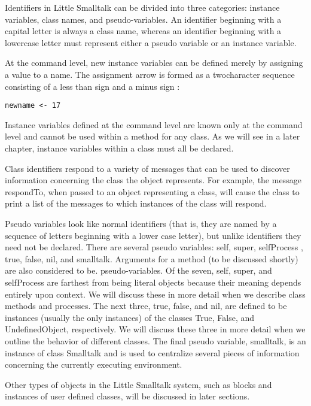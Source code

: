 
Identifiers in Little Smalltalk can be divided into three categories: instance
variables, class names, and pseudo-variables. An identifier beginning with
a capital letter is always a class name, whereas an identifier beginning
with a lowercase letter must represent either a pseudo variable or an
instance variable.

At the command level, new instance variables can be defined merely
by assigning a value to a name. The assignment arrow is formed as a twocharacter sequence consisting of a less than sign and a minus sign
:
\begin{lstlisting}
newname <- 17
\end{lstlisting}

Instance variables defined at the command level are known only at the
command level and cannot be used within a method for any class. As we
will see in a later chapter, instance variables within a class must all be
declared.

Class identifiers respond to a variety of messages that can be used to
discover information concerning the class the object represents. For example, the message respondTo, when passed to an object representing a
class, will cause the class to print a list of the messages to which instances
of the class will respond.

Pseudo variables look like normal identifiers (that is, they are named
by a sequence of letters beginning with a lower case letter), but unlike
identifiers they need not be declared. There are several pseudo variables:
self, super, selfProcess
, true, false, nil, and smalltalk. Arguments for
a method (to be discussed shortly) are also considered to be. pseudo-variables. Of the seven, self, super, and selfProcess are farthest from being
literal objects because their meaning depends entirely upon context. We
will discuss these in more detail when we describe class methods and
processes. The next three, true, false, and nil, are defined to be instances
(usually the only instances) of the classes True, False, and UndefinedObject, respectively. We will discuss these three in more detail when
we outline the behavior of different classes. The final pseudo variable,
smalltalk, is an instance of class Smalltalk and is used to centralize several
pieces of information concerning the currently executing environment.

Other types of objects in the Little Smalltalk system, such as blocks
and instances of user defined classes, will be discussed in later sections.
